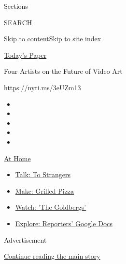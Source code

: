 Sections

SEARCH

\protect\hyperlink{site-content}{Skip to
content}\protect\hyperlink{site-index}{Skip to site index}

\href{https://myaccount.nytimes3xbfgragh.onion/auth/login?response_type=cookie\&client_id=vi}{}

\href{https://www.nytimes3xbfgragh.onion/section/todayspaper}{Today's
Paper}

Four Artists on the Future of Video Art

\url{https://nyti.ms/3eUZm13}

\begin{itemize}
\item
\item
\item
\item
\item
\end{itemize}

\href{https://www.nytimes3xbfgragh.onion/spotlight/at-home?action=click\&pgtype=Article\&state=default\&region=TOP_BANNER\&context=at_home_menu}{At
Home}

\begin{itemize}
\tightlist
\item
  \href{https://www.nytimes3xbfgragh.onion/2020/08/03/well/family/the-benefits-of-talking-to-strangers.html?action=click\&pgtype=Article\&state=default\&region=TOP_BANNER\&context=at_home_menu}{Talk:
  To Strangers}
\item
  \href{https://www.nytimes3xbfgragh.onion/2020/08/01/at-home/coronavirus-make-pizza-on-a-grill.html?action=click\&pgtype=Article\&state=default\&region=TOP_BANNER\&context=at_home_menu}{Make:
  Grilled Pizza}
\item
  \href{https://www.nytimes3xbfgragh.onion/2020/07/31/arts/television/goldbergs-abc-stream.html?action=click\&pgtype=Article\&state=default\&region=TOP_BANNER\&context=at_home_menu}{Watch:
  'The Goldbergs'}
\item
  \href{https://www.nytimes3xbfgragh.onion/interactive/2020/at-home/even-more-reporters-editors-diaries-lists-recommendations.html?action=click\&pgtype=Article\&state=default\&region=TOP_BANNER\&context=at_home_menu}{Explore:
  Reporters' Google Docs}
\end{itemize}

Advertisement

\protect\hyperlink{after-top}{Continue reading the main story}

